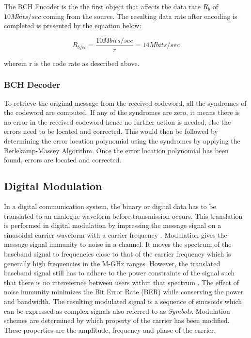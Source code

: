 \documentclass[pdftex,11pt,a4paper]{article}
\begin{document}
The BCH Encoder is the the first object that affects the data rate \textit{$R_{b}$} of $10Mbits/sec$ coming from the source. The resulting data rate after encoding is completed is presented by the equation below:

\begin{equation}
	R_{bfec} = \frac{10Mbits/sec}{r} = 14Mbits/sec
\end{equation}

wherein r is the code rate as described above.

\subsubsection{BCH Decoder}
To retrieve the original message from the received codeword, all the syndromes of the codeword are computed. If any of the syndromes are zero, it means there is no error in the received codeword hence no further action is needed, else the errors need to be located and corrected. This would then be followed by determining the error location polynomial using the syndromes by applying the Berlekamp-Massey Algorithm. Once the error location polynomial has been found, errors are located and corrected.

\subsection{Digital Modulation}
In a digital communication system, the binary or digital data has to be translated to an analogue waveform before transmission occurs. This translation is performed in digital modulation by impressing the message signal on a sinusoidal carrier waveform with a carrier frequency . Modulation gives the message signal immunity to noise in a channel. It moves the spectrum of the baseband signal to frequencies close to that of the carrier frequency which is generally high frequencies in the M-GHz ranges. However, the translated baseband signal still has to adhere to the power constraints of the signal such that there is no interefernce between users within that spectrum \cite{book10}. The effect of noise immunity minimizes the Bit Error Rate (BER) while conserving the power and bandwidth. The resulting modulated signal is a sequence of sinusoids which can be expressed as complex signals also referred to as \textit{Symbols}. Modulation schemes are determined by which property of the carrier has been modified. These properties are the amplitude, frequency and phase of the carrier.
\end{document}
